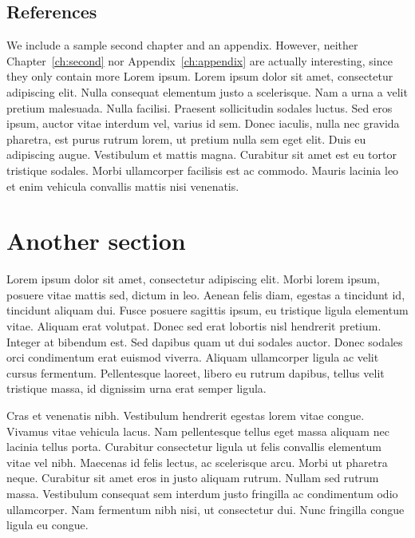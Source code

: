 \subsection{References}

We include a sample second chapter and an appendix. However, neither Chapter~\ref{ch:second} nor Appendix~\ref{ch:appendix} are actually interesting, since they only contain more Lorem ipsum. Lorem ipsum dolor sit amet, consectetur adipiscing elit. Nulla consequat elementum justo a scelerisque. Nam a urna a velit pretium malesuada. Nulla facilisi. Praesent sollicitudin sodales luctus. Sed eros ipsum, auctor vitae interdum vel, varius id sem. Donec iaculis, nulla nec gravida pharetra, est purus rutrum lorem, ut pretium nulla sem eget elit. Duis eu adipiscing augue. Vestibulum et mattis magna. Curabitur sit amet est eu tortor tristique sodales. Morbi ullamcorper facilisis est ac commodo. Mauris lacinia leo et enim vehicula convallis mattis nisi venenatis.

\section{Another section}

Lorem ipsum dolor sit amet, consectetur adipiscing elit. Morbi lorem ipsum, posuere vitae mattis sed, dictum in leo. Aenean felis diam, egestas a tincidunt id, tincidunt aliquam dui. Fusce posuere sagittis ipsum, eu tristique ligula elementum vitae. Aliquam erat volutpat. Donec sed erat lobortis nisl hendrerit pretium. Integer at bibendum est. Sed dapibus quam ut dui sodales auctor. Donec sodales orci condimentum erat euismod viverra. Aliquam ullamcorper ligula ac velit cursus fermentum. Pellentesque laoreet, libero eu rutrum dapibus, tellus velit tristique massa, id dignissim urna erat semper ligula.

Cras et venenatis nibh. Vestibulum hendrerit egestas lorem vitae congue. Vivamus vitae vehicula lacus. Nam pellentesque tellus eget massa aliquam nec lacinia tellus porta. Curabitur consectetur ligula ut felis convallis elementum vitae vel nibh. Maecenas id felis lectus, ac scelerisque arcu. Morbi ut pharetra neque. Curabitur sit amet eros in justo aliquam rutrum. Nullam sed rutrum massa. Vestibulum consequat sem interdum justo fringilla ac condimentum odio ullamcorper. Nam fermentum nibh nisi, ut consectetur dui. Nunc fringilla congue ligula eu congue.

